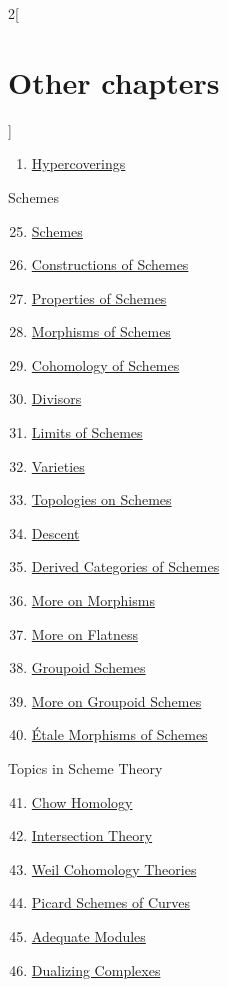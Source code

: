 \begin{multicols}{2}[\section{Other chapters}]
\begin{enumerate}
\item \hyperref[hypercovering-section-phantom]{Hypercoverings}
\end{enumerate}
Schemes
\begin{enumerate}
\setcounter{enumi}{24}
\item \hyperref[schemes-section-phantom]{Schemes}
\item \hyperref[constructions-section-phantom]{Constructions of Schemes}
\item \hyperref[properties-section-phantom]{Properties of Schemes}
\item \hyperref[morphisms-section-phantom]{Morphisms of Schemes}
\item \hyperref[coherent-section-phantom]{Cohomology of Schemes}
\item \hyperref[divisors-section-phantom]{Divisors}
\item \hyperref[limits-section-phantom]{Limits of Schemes}
\item \hyperref[varieties-section-phantom]{Varieties}
\item \hyperref[topologies-section-phantom]{Topologies on Schemes}
\item \hyperref[descent-section-phantom]{Descent}
\item \hyperref[perfect-section-phantom]{Derived Categories of Schemes}
\item \hyperref[more-morphisms-section-phantom]{More on Morphisms}
\item \hyperref[flat-section-phantom]{More on Flatness}
\item \hyperref[groupoids-section-phantom]{Groupoid Schemes}
\item \hyperref[more-groupoids-section-phantom]{More on Groupoid Schemes}
\item \hyperref[etale-section-phantom]{\'Etale Morphisms of Schemes}
\end{enumerate}
Topics in Scheme Theory
\begin{enumerate}
\setcounter{enumi}{40}
\item \hyperref[chow-section-phantom]{Chow Homology}
\item \hyperref[intersection-section-phantom]{Intersection Theory}
\item \hyperref[weil-section-phantom]{Weil Cohomology Theories}
\item \hyperref[pic-section-phantom]{Picard Schemes of Curves}
\item \hyperref[adequate-section-phantom]{Adequate Modules}
\item \hyperref[dualizing-section-phantom]{Dualizing Complexes}

\end{enumerate}
\end{multicols}
